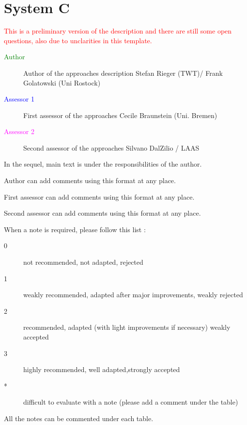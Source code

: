 \chapter{System C}

\textcolor{red}{
This is a preliminary version of the description and there are still some open questions, also due to unclarities in this template.
}

\begin{description}
\item[\textcolor{green}{Author}] Author of the approaches description Stefan Rieger (TWT)/ Frank Golatowski (Uni Rostock)
\item[\textcolor{blue}{Assessor 1}] First assessor of the approaches Cecile Braunstein (Uni. Bremen)
\item[\textcolor{magenta}{Assessor 2}] Second assessor of the approaches Silvano DalZilio / LAAS
\end{description}

In the sequel, main text is under the responsibilities of the author.

\begin{author_comment}
Author can add comments using this format at any place.
\end{author_comment}

\begin{assessor1}
First assessor can add comments using this format at any place.
\end{assessor1}

\begin{assessor2}
Second assessor can add comments using this format at any place.
\end{assessor2}

When a note is required, please follow this list :
\begin{description}
\item[0] not recommended, not adapted, rejected
\item[1] weakly recommended, adapted after major improvements, weakly rejected
\item[2] recommended, adapted (with light improvements if necessary) weakly accepted
\item[3] highly recommended, well adapted,strongly accepted
\item[*] difficult to evaluate with a note (please add a comment under the table)
\end{description}

All the notes can be commented under each table.

